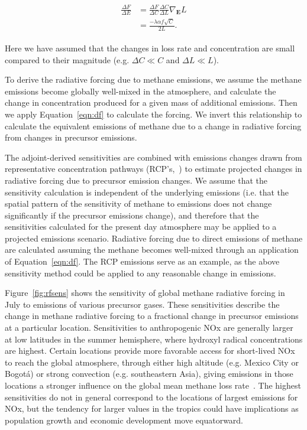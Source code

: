 \begin{equation}
\begin{align}
\begin{split}
\frac{\Delta F}{\Delta E} &= \frac{\Delta F}{\Delta C} \frac{\Delta C}{\Delta L} \nabla_{\mathbf{E}} L \\
                          &= \frac{-\lambda \alpha f \sqrt{C}}{2L}.
\end{split}
\label{eqn:dfde}
\end{align}
\end{equation}

Here we have assumed that the changes in loss rate and concentration are small compared to their magnitude (e.g. $\Delta C \ll C$ and $\Delta L \ll L$).

To derive the radiative forcing due to methane emissions, we assume the methane emissions become globally well-mixed in the atmosphere, and calculate the change in concentration produced for a given mass of additional emissions. Then we apply Equation~\ref{eqn:df} to calculate the forcing. We invert this relationship to calculate the equivalent emissions of methane due to a change in radiative forcing from changes in precursor emissions.

The adjoint-derived sensitivities are combined with emissions changes drawn from representative concentration pathways (RCP's,~\citet{ref:lamarque2011,ref:vanvuuren2011}) to estimate projected changes in radiative forcing due to precursor emission changes. We assume that the sensitivity calculation is independent of the underlying emissions (i.e. that the spatial pattern of the sensitivity of methane to emissions does not change significantly if the precursor emissions change), and therefore that the sensitivities calculated for the present day atmosphere may be applied to a projected emissions scenario. Radiative forcing due to direct emissions of methane are calculated assuming the methane becomes well-mixed through an application of Equation~\ref{eqn:df}. The RCP emissions serve as an example, as the above sensitivity method could be applied to any reasonable change in emissions.

Figure~\ref{fig:rfsens} shows the sensitivity of global methane radiative forcing in July to emissions of various precursor gases. These sensitivities describe the change in methane radiative forcing to a fractional change in precursor emissions at a particular location. Sensitivities to anthropogenic NOx are generally larger at low latitudes in the summer hemisphere, where hydroxyl radical concentrations are highest. Certain locations provide more favorable access for short-lived NOx to reach the global atmosphere, through either high altitude (e.g. Mexico City or Bogot\'a) or strong convection (e.g. southeastern Asia), giving emissions in those locations a stronger influence on the global mean methane loss rate~\citep{ref:bowman2012}. The highest sensitivities do not in general correspond to the locations of largest emissions for NOx, but the tendency for larger values in the tropics could have implications as population growth and economic development move equatorward.


